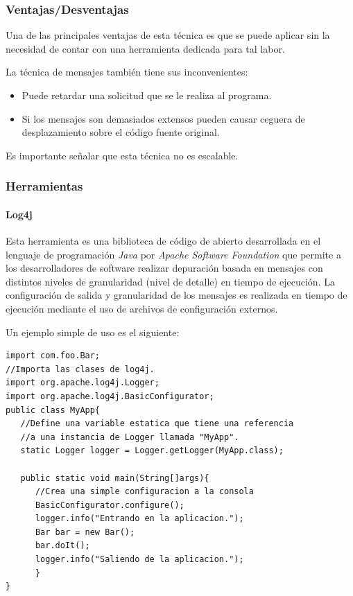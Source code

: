 \documentclass[12pt,legalpaper]{report}
\begin{document}
			\subsubsection{Ventajas/Desventajas}

Una de las principales ventajas de esta técnica es que se puede aplicar sin la necesidad de contar con una herramienta dedicada para tal labor.

La técnica de mensajes también tiene sus inconvenientes:
\begin{itemize}
	\item Puede retardar una solicitud que se le realiza al programa. 
	\item Si los mensajes son demasiados extensos pueden causar ceguera de desplazamiento sobre el código fuente original.
\end{itemize}	
Es importante señalar que esta técnica no es escalable.  


			\subsubsection{Herramientas}
				\paragraph{Log4j}
			  			
Esta herramienta \cite{log4j} es una biblioteca de código de abierto desarrollada en el lenguaje de programación \textit{Java} por \textit{Apache Software Foundation} que permite a los desarrolladores de software realizar depuración basada en mensajes con distintos niveles de granularidad (nivel de detalle) en tiempo de ejecución. La configuración de salida y granularidad de los mensajes es realizada en tiempo de ejecución mediante el uso de archivos de configuración externos.

Un ejemplo simple de uso es el siguiente:
\begin{singlespace}
\begin{lstlisting}
import com.foo.Bar;
//Importa las clases de log4j.
import org.apache.log4j.Logger;
import org.apache.log4j.BasicConfigurator;
public class MyApp{
   //Define una variable estatica que tiene una referencia
   //a una instancia de Logger llamada "MyApp".
   static Logger logger = Logger.getLogger(MyApp.class);

   public static void main(String[]args){
      //Crea una simple configuracion a la consola
      BasicConfigurator.configure();
      logger.info("Entrando en la aplicacion.");
      Bar bar = new Bar();
      bar.doIt();
      logger.info("Saliendo de la aplicacion.");	
      }
}	
\end{lstlisting}
\end{singlespace}
	
\end{document}
